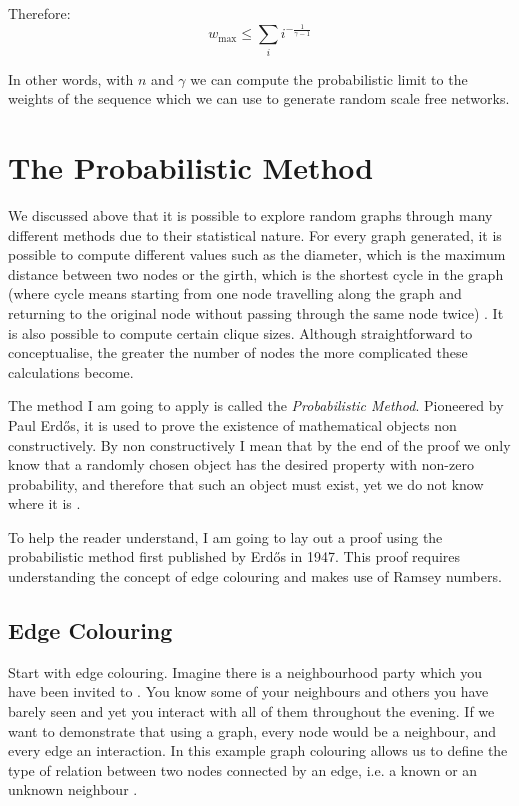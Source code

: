 \documentclass[12pt, a4paper]{article}   %
\begin{document}
Therefore:
\begin{equation} \label{eq:wmax-leq-T}
w_{\text{max}} \leq \sum_{i}{i^{ -\frac{1}{\gamma-1}}}
\end{equation}


In other words, with \(n\) and \(\gamma\) we can compute the probabilistic limit to the weights of the sequence which we can use to generate random scale free networks.






\section{The Probabilistic Method}

We discussed above that it is possible to explore random graphs through many different methods due to their statistical nature. For every graph generated, it is possible to compute different values such as the diameter, which is the maximum distance between two nodes or the girth, which is the shortest cycle in the graph (where cycle means starting from one node travelling along the graph and returning to the original node without passing through the same node twice) \autocite{GlossaryGraphTheory2026}. It is also possible to compute certain clique sizes. Although straightforward to conceptualise, the greater the number of nodes the more complicated these calculations become. 


The method I am going to apply is called the \textit{Probabilistic Method}. Pioneered by Paul Erdős, it is used to prove the existence of mathematical objects non constructively. By non constructively I mean that by the end of the proof we only know that a randomly chosen object has the desired property with non-zero probability, and therefore that such an object must exist, yet we do not know where it is \autocite{alonProbabilisticMethod2008}. 

To help the reader understand, I am going to lay out a proof using the probabilistic method first published by Erdős in 1947. This proof requires understanding the concept of edge colouring and makes use of Ramsey numbers. 

\subsection{Edge Colouring}

Start with edge colouring. Imagine there is a neighbourhood party which you have been invited to \autocite{simkinConstructionCountingProbabilistic}. You know some of your neighbours and others you have barely seen and yet you interact with all of them throughout the evening. If we want to demonstrate that using a graph, every node would be a neighbour, and every edge an interaction. In this example graph colouring allows us to define the type of relation between two nodes connected by an edge, i.e. a known or an unknown neighbour \autocite{soiferMathematicalColoringBook2009}. 
\end{document}

